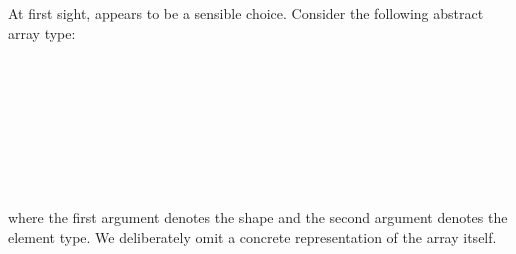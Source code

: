 At first sight,  appears to be a sensible choice. Consider the
following abstract array type:
\begin{code}[hide] %
\>[0]\AgdaSpace{}%
\AgdaSpace{}%
\<%
\\
\>[0][@{}l@{\AgdaIndent{0}}]%
\>[2]\AgdaSpace{}%
\AgdaSpace{}%
\<%
\\
%
\\[\AgdaEmptyExtraSkip]%
%
\>[2]\<%
\\
\>[2][@{}l@{\AgdaIndent{0}}]%
\>[4]\AgdaSpace{}%
\AgdaSpace{}%
\AgdaSymbol{:}\AgdaSpace{}%
\AgdaSpace{}%
\<%
\\
%
\\[\AgdaEmptyExtraSkip]%
%
\>[2]\<%
\\
\>[0]\<%
\end{code}
\begin{mathpar}
\end{mathpar}
where the first argument denotes the shape and the second argument denotes the
element type. We deliberately omit a concrete representation of the array
itself.

